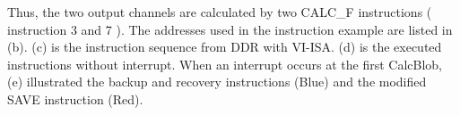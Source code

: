 Thus, the two output channels are calculated by two CALC\_F instructions ( instruction 3 and 7 ). The addresses used in the instruction example are listed in (b). (c) is the instruction sequence from DDR with VI-ISA. (d) is the executed instructions without interrupt. When an interrupt occurs at the first CalcBlob, (e) illustrated the backup and recovery instructions (Blue) and the modified SAVE instruction (Red).

